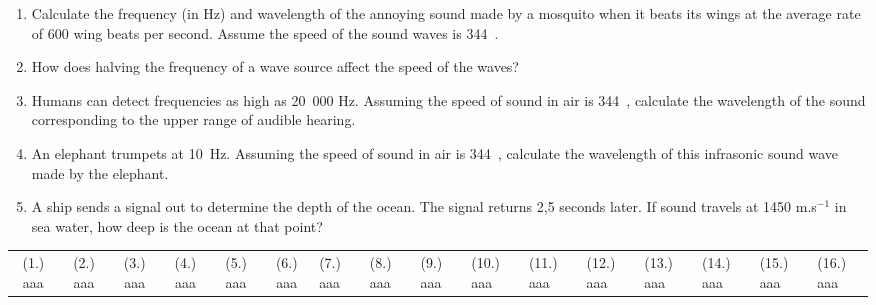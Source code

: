 \begin{eocexercises}{}
\begin{enumerate}
\item{Calculate the frequency (in Hz) and wavelength of the annoying sound made by a mosquito when it beats its wings at the average rate of 600 wing beats per second. Assume the speed of the sound waves is 344~\ms.}
\item{How does halving the frequency of a wave source affect the speed of the waves?}
\item{Humans can detect frequencies as high as 20~000 Hz. Assuming the speed of sound in air is 344~\ms, calculate the wavelength of the sound corresponding to the upper range of audible hearing.}
\item{An elephant trumpets at 10~Hz. Assuming the speed of sound in air is 344~\ms, calculate the wavelength of this infrasonic sound wave made by the elephant.}

\item A ship sends a signal out to determine the depth of the ocean. The signal returns 2,5 seconds later. If sound travels at
1450 m.s$^{-1}$ in sea water, how deep is the ocean at that point?

\end{enumerate}
\practiceinfo

\begin{tabular}[h]{cccccc}
(1.) aaa & (2.) aaa & (3.) aaa & (4.) aaa & (5.) aaa & (6.) aaa & (7.) aaa & (8.) aaa & (9.) aaa & (10.) aaa & (11.) aaa & (12.) aaa & (13.) aaa & (14.) aaa & (15.) aaa & (16.) aaa & 
 \end{tabular}
\end{eocexercises}






